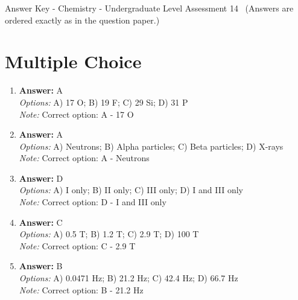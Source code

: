 \documentclass[12pt]{article}
\begin{document}
\begin{center}
Answer Key - Chemistry - Undergraduate Level Assessment 14 \
\small (Answers are ordered exactly as in the question paper.)
\end{center}

\section*{Multiple Choice}
\begin{enumerate}[label=\arabic*.]
\item \textbf{Answer:} A
\\ \textit{Options:} A) 17 O; B) 19 F; C) 29 Si; D) 31 P
\\ \textit{Note:} Correct option: A - 17 O
\item \textbf{Answer:} A
\\ \textit{Options:} A) Neutrons; B) Alpha particles; C) Beta particles; D) X-rays
\\ \textit{Note:} Correct option: A - Neutrons
\item \textbf{Answer:} D
\\ \textit{Options:} A) I only; B) II only; C) III only; D) I and III only
\\ \textit{Note:} Correct option: D - I and III only
\item \textbf{Answer:} C
\\ \textit{Options:} A) 0.5 T; B) 1.2 T; C) 2.9 T; D) 100 T
\\ \textit{Note:} Correct option: C - 2.9 T
\item \textbf{Answer:} B
\\ \textit{Options:} A) 0.0471 Hz; B) 21.2 Hz; C) 42.4 Hz; D) 66.7 Hz
\\ \textit{Note:} Correct option: B - 21.2 Hz
\end{enumerate}
\end{document}
